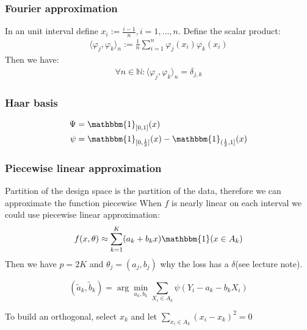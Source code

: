 \subsubsection*{Fourier approximation}
\begin{lemma}
	In an unit interval define $x_i := \frac{i - 1}{n}, i = 1, \dots, n$. Define the scalar product:
	\begin{align*}
		\langle \varphi_j, \varphi_k \rangle_n := \frac{1}{n} \sum_{i = 1}^n \varphi_j(x_i) \varphi_k(x_i)
	\end{align*}
	Then we have:
	\begin{align*}
		\forall n \in \mathbb{N}: \langle \varphi_j, \varphi_k \rangle_n = \delta_{j,k}
	\end{align*}
\end{lemma}

\subsubsection*{Haar basis}
\begin{align*}
	\Psi &= \mathbbm{1}_{[0, 1]}(x) \\
	\psi &= \mathbbm{1}_{[0, \frac{1}{2}]}(x) - \mathbbm{1}_{(\frac{1}{2}, 1]}(x)
\end{align*}

\subsubsection*{Piecewise linear approximation}
Partition of the design space is the partition of the data, therefore we can approximate the function piecewise
When $f$ is nearly linear on each interval we could use piecewise linear approximation:
\begin{equation}
	f(x, \theta) \approx \sum_{k = 1}^K (a_k + b_k x) \mathbbm{1}(x \in A_k)
\end{equation}
Then we have $p = 2K$ and $\theta_j = (a_j, b_j)$
why the loss has a $\delta$(see lecture note).

\begin{theorem}
	\begin{equation*}
		(\tilde{a}_k, \tilde{b}_k) = \arg \min_{a_k, b_k} \sum_{X_i \in A_k} \psi(Y_i - a_k - b_kX_i)
	\end{equation*}
\end{theorem}
To build an orthogonal, select $x_k$ and let $\sum_{x_i \in A_k}(x_i - x_k)^2 = 0$

